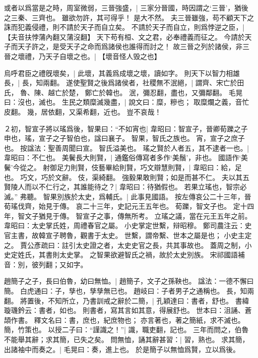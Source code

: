 或者以爲當是之時，周室微弱，三晉強盛，|{
	三家分晉國，時因謂之`三晉'，猶後之三秦、三齊也。
	}
雖欲勿許，其可得乎！
是大不然。
夫三晉雖強，苟不顧天下之誅而犯義侵禮，則不請於天子而自立矣。
不請於天子而自立，則爲悖逆之臣，|{
	【夫音扶悖蒲內翻又蒲沒翻】}
天下苟有桓、文之君，必奉禮義而征之。
今請於天子而天子許之，是受天子之命而爲諸侯也誰得而討之！
故三晉之列於諸侯，非三晉之壞禮，乃天子自壞之也。|{
	【壞音怪人毁之也】
	}


烏呼君臣之禮旣壞矣，|{
	此壞，其義爲成壞之壞，讀如字。
	}
則天下以智力相雄長，|{
	長，知兩翻。
	}
遂使聖賢之後爲諸侯者，社稷無不泯絕，|{
	謂齊、宋亡於田氏，
	魯、陳、越亡於楚，
	鄭亡於韓也。
	泯，彌忍翻，盡也，又彌鄰翻。
	毛晃曰：沒也，滅也。
	}
生民之類糜滅幾盡，|{
	說文曰：糜，糝也；
	取糜爛之義，音忙皮翻。
	幾，居依翻，又渠希翻，近也。
	}
豈不哀哉！

２初，智宣子將以瑤爲後，智果曰：“不如宵也|{
	韋昭曰：智宣子，晉卿荀躒之子申也，瑤，宣子之子智伯也，諡曰襄子。
	智果，智氏之族也。
	宵，宣子之庶子也。
	按諡法：聖善周聞曰宣。
	智氏溢美也。
	}
瑤之賢於人者五，其不逮者一也。|{
	韋昭曰：不仁也。
	}
美鬢長大則賢，|{
	通鑑俗傳寫者多作‘美鬚’，非也。
	國語作‘美鬢’今從之。
	}
射御足力則賢，伎藝畢給則賢，巧文辯慧則賢，|{
	韋昭曰：給，足也。
	巧文，巧於文辭。
	伎，渠綺翻。
	}
強毅果敢則賢；如是而甚不仁。
夫以其五賢陵人而以不仁行之，其誰能待之？|{
	韋昭曰：待猶假也。
	}
若果立瑤也，智宗必滅。”
弗聽。
智果別族於太史，爲輔氏。|{
	此事見國語。
	按左傳哀公二十三年，晉荀瑤伐齊，始見于傳。
	哀二十三年，史記元王五年也。
	荀躒，智文子也。
	定十四年，智文子猶見于傳。
	智宣子之事，傳無所考。
	立瑤之議，當在元王五年之前。
	韋昭曰：太史掌氏姓，周禮春官之屬。
	小史掌定世繫，辩昭穆。
	鄭司農注云：史官主書，故韓宣子聘魯，觀書于太史。
	世繫，謂帝繫、世本之屬是也；
	小史主定之。
	賈公彥疏曰：註引太史證之者，太史史官之長，共其事故也。
	蓋周之制，小史定姓氏，其書則太史掌。
	之智果欲避智氏之禍，故於太史別族。
	宋祁國語補音：別，彼列翻；又如字。
	}

趙簡子之子，長曰伯魯，幼曰無恤。|{
	趙簡子，文子之孫鞅也。
	諡法：一德不懈曰簡。
	白虎通曰：子，孳也，孳孳無已也。
	趙岐曰：子者男子之通稱也。
	長，知兩翻。
	}
將置後，不知所立，乃書訓戒之辭於二簡，|{
	孔穎達曰：書者，舒也。
	書緯璇璣鈐云：書者，如也。
	則書者，寫其言如其意，得展舒也。
	世本曰：沮誦、蒼頡作書。
	釋文名曰：書，庶也，紀庶物也；
	亦言著也，著之簡紙，求不滅也。
	簡，竹策也。
	}
以授二子曰：“謹識之！”|{
	識，職吏翻，記也。
	}
三年而問之，伯魯不能舉其辭；求其簡，已失之矣。
問無恤，誦其辭甚習：|{
	習，熟也。}
求其簡，出諸袖中而奏之。|{
	毛晃曰：奏，進上也。
	}
於是簡子以無恤爲賢，立以爲後。



